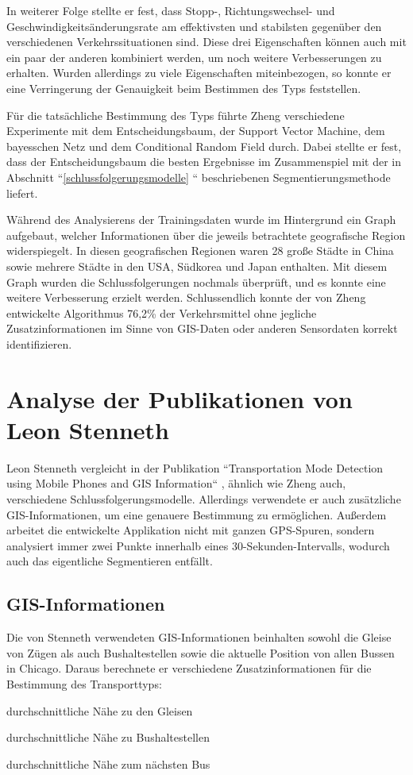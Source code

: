 In weiterer Folge stellte er fest, dass Stopp-, Richtungswechsel- und Geschwindigkeitsänderungsrate am effektivsten und stabilsten gegenüber den verschiedenen Verkehrssituationen sind. Diese drei Eigenschaften können auch mit ein paar der anderen kombiniert werden, um noch weitere Verbesserungen zu erhalten. Wurden allerdings zu viele Eigenschaften miteinbezogen, so konnte er eine Verringerung der Genauigkeit beim Bestimmen des Typs feststellen. 

Für die tatsächliche Bestimmung des Typs führte Zheng verschiedene Experimente mit dem Entscheidungsbaum, der Support Vector Machine, dem bayesschen Netz und dem Conditional Random Field durch. Dabei stellte er fest, dass der Entscheidungsbaum die besten Ergebnisse im Zusammenspiel mit der in Abschnitt ``\ref{schlussfolgerungsmodelle} `` beschriebenen Segmentierungsmethode liefert. 

Während des Analysierens der Trainingsdaten wurde im Hintergrund ein Graph aufgebaut, welcher Informationen über die jeweils betrachtete geografische Region widerspiegelt. In diesen geografischen Regionen waren 28 große Städte in China sowie mehrere Städte in den USA, Südkorea und Japan enthalten. Mit diesem Graph wurden die Schlussfolgerungen nochmals überprüft, und es konnte eine weitere Verbesserung erzielt werden. Schlussendlich konnte der von Zheng entwickelte Algorithmus 76,2\% der Verkehrsmittel ohne jegliche Zusatzinformationen im Sinne von GIS-Daten oder anderen Sensordaten korrekt identifizieren.

\section{Analyse der Publikationen von Leon Stenneth}
Leon Stenneth vergleicht in der Publikation ``Transportation Mode Detection using Mobile Phones and GIS Information`` \cite{stenneth_transportation_2011}, ähnlich wie Zheng auch, verschiedene Schlussfolgerungsmodelle. Allerdings verwendete er auch zusätzliche GIS-Informationen, um eine genauere Bestimmung zu ermöglichen. Außerdem arbeitet die entwickelte Applikation nicht mit ganzen GPS-Spuren, sondern analysiert immer zwei Punkte innerhalb eines 30-Sekunden-Intervalls, wodurch auch das eigentliche Segmentieren entfällt.

\subsection{GIS-Informationen}
Die von Stenneth verwendeten GIS-Informationen beinhalten sowohl die Gleise von Zügen als auch Bushaltestellen sowie die aktuelle Position von allen Bussen in Chicago. Daraus berechnete er verschiedene Zusatzinformationen für die Bestimmung des Transporttyps:
\begin{pitemize}
\item durchschnittliche Nähe zu den Gleisen
\item durchschnittliche Nähe zu Bushaltestellen
\item durchschnittliche Nähe zum nächsten Bus
\end{pitemize}

